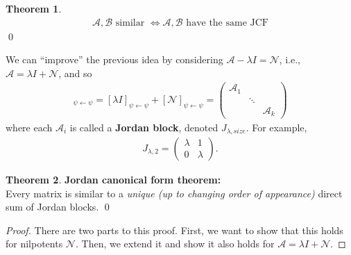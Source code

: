 \documentclass{article}
\theoremstyle{definition}
\newtheorem{thm}{Theorem}[section]
\newcommand{\A}{\mathcal{A}}
\begin{document}
\begin{thm}
	\begin{align*}
	\boxed{\A, \mathcal{B} \text{ similar } \iff \A, \mathcal{B} \text{ have the same JCF}}
	\end{align*}\qed
\end{thm}

We can ``improve'' the previous idea by considering $\A - \lambda I = \mathcal{N}$, i.e., $\A = \lambda I + \mathcal{N}$, and so
\begin{align*}
[\lambda I + \mathcal{N}]_{\psi \leftarrow \psi} = [\lambda I]_{\psi \leftarrow \psi} + [\mathcal{N}]_{\psi\leftarrow\psi}  = \begin{pmatrix}
\A_1 & & \\
& \ddots & \\
& & \A_k
\end{pmatrix}
\end{align*}
where each $\A_i$ is called a \textbf{Jordan block}, denoted $J_{\lambda, size}$. For example,
\begin{align*}
J_{\lambda, 2} = \begin{pmatrix}
\lambda & 1\\0& \lambda 
\end{pmatrix}.
\end{align*}

\begin{thm}\textbf{Jordan canonical form theorem:}\\
	Every matrix is similar to a \textit{unique (up to changing order of appearance)} direct sum of Jordan blocks. \qed
	
	\begin{proof}
		There are two parts to this proof. First, we want to show that this holds for nilpotents $\mathcal{N}$. Then, we extend it and show it also holds for $\A = \lambda I + \mathcal{N}$.
	\end{proof}
\end{thm}
\end{document}
